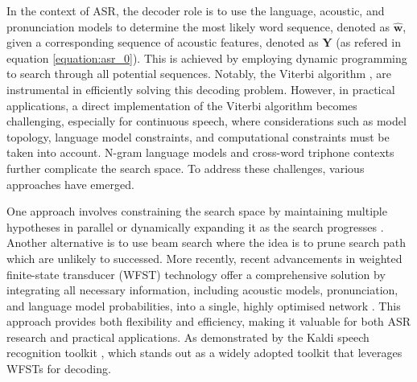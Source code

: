 

In the context of ASR, the decoder role is to use the language, acoustic, and pronunciation models to determine the most likely word sequence, denoted as $\boldsymbol{\hat{w}}$, given a corresponding sequence of acoustic features, denoted as $\boldsymbol{Y}$ (as refered in equation \ref{equation:asr_0}). This is achieved by employing dynamic programming to search through all potential sequences. Notably, the Viterbi algorithm \cite{viterbi_decoder}, are instrumental in efficiently solving this decoding problem. However, in practical applications, a direct implementation of the Viterbi algorithm becomes challenging, especially for continuous speech, where considerations such as model topology, language model constraints, and computational constraints must be taken into account. N-gram language models and cross-word triphone contexts further complicate the search space. To address these challenges, various approaches have emerged. 

One approach involves constraining the search space by maintaining multiple hypotheses in parallel \cite{valtchev1994novel} or dynamically expanding it as the search progresses \cite{aubert1995large}. Another alternative is to use beam search where the idea is to prune search path which are unlikely to successed. More recently, recent advancements in weighted finite-state transducer (WFST) technology offer a comprehensive solution by integrating all necessary information, including acoustic models, pronunciation, and language model probabilities, into a single, highly optimised network \cite{mohri1997finite,caseiro2002using}. This approach provides both flexibility and efficiency, making it valuable for both ASR research and practical applications. As demonstrated by the Kaldi speech recognition toolkit \cite{kaldi}, which  stands out as a widely adopted toolkit that leverages WFSTs for decoding. 

